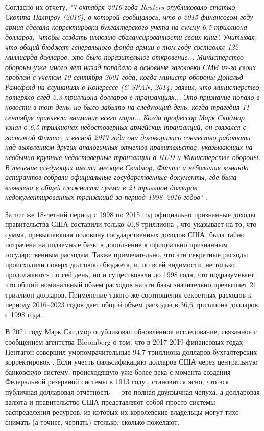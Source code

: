 \documentclass[10pt,twocolumn,letterpaper]{article}
\begin{document}
Согласно их отчету, \textit{"7 октября 2016 года Reuters опубликовало статью Скотта Палтроу (2016), в которой сообщалось, что в 2015 финансовом году армия сделала корректировки бухгалтерского учета на сумму 6,5 триллиона долларов, 'чтобы создать иллюзию сбалансированности своих книг'. Учитывая, что общий бюджет генерального фонда армии в том году составлял 122 миллиарда долларов, это было поразительное откровение... Министерство обороны уже много лет назад попадало в основные заголовки СМИ из-за своих проблем с учетом 10 сентября 2001 года, когда министр обороны Дональд Рамсфелд на слушаниях в Конгрессе (C-SPAN, 2014) заявил, что министерство потеряло след 2,3 триллиона долларов в транзакциях... Это признание попало в новости в тот день, но было забыто на следующий день, когда трагедия 11 сентября привлекла внимание всего мира... Когда профессор Марк Скидмор узнал о 6,5 триллионах недостоверных армейских транзакций, он связался с госпожой Фиттс, и весной 2017 года они договорились совместно работать над выявлением других аналогичных отчетов правительства, указывающих на необычно крупные недостоверные транзакции в HUD и Министерстве обороны. В течение следующих шести месяцев Скидмор, Фиттс и небольшая команда аспирантов собрали официальные государственные документы, где была выявлена в общей сложности сумма в 21 триллион долларов недокументированных транзакций за период 1998–2016 годов"} \cite{12}.

За тот же 18-летний период с 1998 по 2015 год официально признанные доходы правительства США составили только 40,8 триллиона \cite{15}, что указывает на то, что сумма, превышающая половину государственных доходов США, была тайно потрачена на подземные базы в дополнение к официально признанным государственным расходам. Также примечательно, что эти секретные расходы происходили поверх долгового бюджета, и, по всей видимости, не только продолжаются по сей день, но и существовали до 1998 года, что подразумевает, что общий номинальный объем расходов на эти базы значительно превышает 21 триллион долларов. Применение такого же соотношения секретных расходов к периоду 2016–2023 годов дает общий объем расходов в 36,6 триллиона долларов с 1998 года.

В 2021 году Марк Скидмор опубликовал обновлённое исследование, связанное с сообщением агентства Bloomberg о том, что в 2017-2019 финансовых годах Пентагон совершил умопомрачительные 94,7 триллиона долларов бухгалтерских корректировок \cite{17,18}. Если учесть фальсификацию долларов США через центральную банковскую систему, происходящую уже более века с момента создания Федеральной резервной системы в 1913 году \cite{37}, становится ясно, что вся публичная долларовая отчётность — это полная двуязычная чепуха, а долларовая валюта и правительство США представляют собой просто системы распределения ресурсов, из которых их королевские владельцы могут тихо снимать (а точнее, черпать) столько, сколько пожелают.
\end{document}

